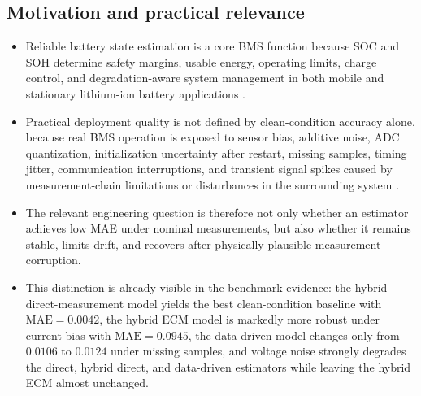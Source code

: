 \documentclass[review,nopreprintline]{elsarticle}
\begin{document}
\subsection{Motivation and practical relevance}
\begin{itemize}[leftmargin=*]
    \item Reliable battery state estimation is a core BMS function because SOC and SOH determine safety margins, usable energy, operating limits, charge control, and degradation-aware system management in both mobile and stationary lithium-ion battery applications \cite{shrivastavaReviewTechnologicalAdvancement2023,guoSystematicReviewElectrochemical2024,yaoSmarterBatteryManagement2025b}.
    \item Practical deployment quality is not defined by clean-condition accuracy alone, because real BMS operation is exposed to sensor bias, additive noise, ADC quantization, initialization uncertainty after restart, missing samples, timing jitter, communication interruptions, and transient signal spikes caused by measurement-chain limitations or disturbances in the surrounding system \cite{liRobustnessSOCEstimation2015,naseriReliableWirelessBMS2025,bergerBenchmarkingBatteryManagement2024}.
    \item The relevant engineering question is therefore not only whether an estimator achieves low MAE under nominal measurements, but also whether it remains stable, limits drift, and recovers after physically plausible measurement corruption.
    \item This distinction is already visible in the benchmark evidence: the hybrid direct-measurement model yields the best clean-condition baseline with $\mathrm{MAE}=0.0042$, the hybrid ECM model is markedly more robust under current bias with $\mathrm{MAE}=0.0945$, the data-driven model changes only from $0.0106$ to $0.0124$ under missing samples, and voltage noise strongly degrades the direct, hybrid direct, and data-driven estimators while leaving the hybrid ECM almost unchanged.
\end{itemize}
\end{document}
